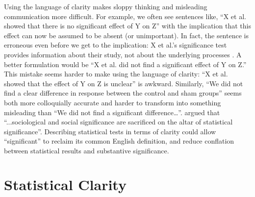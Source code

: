 Using the language of clarity makes sloppy thinking and misleading communication more difficult. 
For example, we often see sentences like, ``X et al. showed that there is no significant effect of Y on Z'' with the implication that this effect can now be assumed to be absent (or unimportant).
In fact, the sentence is erroneous even before we get to the implication: X et al.'s significance test provides information about their study, not about the underlying processes \cite{CanWeCiteThis}.
A better formulation would be ``X et al. did not find a significant effect of Y on Z.''
This mistake seems harder to make using the language of clarity:  ``X et al. showed that the effect of Y on Z is unclear'' is awkward.
Similarly, ``We did not find a clear difference in response between the control and sham groups'' seems both more colloquially accurate and harder to transform into something misleading than ``We did not find a significant difference\ldots''.
\citet{Bernardietal.2017} argued that ``...sociological and social significance are sacrificed on the altar of statistical significance''.
Describing statistical tests in terms of clarity could allow ``significant'' to reclaim its common English definition, and reduce conflation between statistical results and substantive significance.

\section*{Statistical Clarity}


